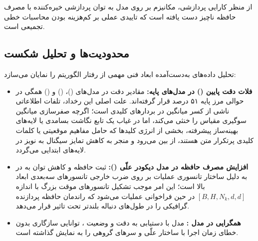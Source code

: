 از منظر کارایی پردازشی، مکانیزم  بر روی مدل  به توان پردازشی خیره‌کننده  با مصرف حافظه ناچیز  دست یافته است که تاییدی عملی بر کم‌هزینه بودن محاسبات خطی تجمیعی است.

\subsection{محدودیت‌ها و تحلیل شکست}
تحلیل داده‌های به‌دست‌آمده ابعاد فنی مهمی از رفتار الگوریتم را نمایان می‌سازد:
\begin{itemize}
    \item \textbf{فلات دقت پایین () در مدل‌های پایه:} مقادیر دقت در مدل‌های  ()،  () و  () همگی در حوالی مرز پایه ۵۱ درصد قرار گرفته‌اند. علت اصلی این رخداد، تلفات اطلاعاتی ناشی از کسر میانگین در بردارهای کلیدی است؛ اگرچه صفرسازی میانگین سوگیری مقیاس را خنثی می‌کند، اما در غیاب یک تابع نگاشت بسامدی یا لایه‌های بهینه‌ساز پیشرفته، بخشی از انرژی کلیدها که حامل مفاهیم موقعیتی یا کلمات کلیدی پرتکرار متن هستند، از بین می‌رود و منجر به کاهش تمایز سیگنال به نویز در لایه‌های ابتدایی می‌گردد.
    \item \textbf{افزایش مصرف حافظه در مدل دیکودر علّی ():} ثبت حافظه  و کاهش توان به  در  به دلیل ساختار تانسوری عملیات  بر روی ضرب خارجی تانسورهای سه‌بعدی ابعاد بالا است؛ این امر موجب تشکیل تانسورهای موقت بزرگ با اندازه $[B, H, N_k, d, d]$ در حین فراخوانی عملیات می‌شود که راندمان حافظه پردازنده گرافیکی را در طول‌های دنباله بلندتر تحت تاثیر قرار می‌دهد.
    \item \textbf{همگرایی در مدل :} مدل  با دستیابی به دقت  و وضعیت ، توانایی سازگاری بدون خطای زمان اجرا با ساختار علّی و سرهای گروهی را به نمایش گذاشته است.
\end{itemize}
